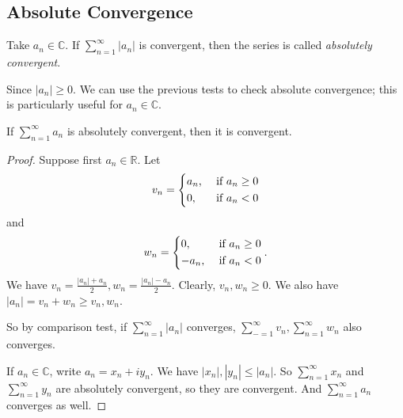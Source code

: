 \subsection{Absolute Convergence}
\begin{definition}
    Take \(a_n \in \mathbb{C}\). If \(\sum\limits_{n=1}^{\infty} \left\vert a_n \right\vert \) is convergent, then the series is called \textit{absolutely convergent}.
\end{definition}
\begin{note}
    Since \(\left\vert a_n \right\vert \geq 0\). We can use the previous tests to check absolute convergence; this is particularly useful for \(a_n \in \mathbb{C}\).
\end{note}
\begin{theorem}
    \label{absiscon}
    If \(\sum\limits_{n=1}^{\infty} a_n\) is absolutely convergent, then it is convergent.
\end{theorem}
\begin{proof}
    Suppose first \(a_n \in \mathbb{R}\). Let
    \[
        v_n = \begin{dcases}
            a_n, &\text{ if } a_n \geq 0\\
            0, &\text{ if }a_n < 0 \\
        \end{dcases}
    \]
    and
    \[
        w_n = \begin{dcases}
            0, &\text{ if } a_n \geq 0\\
            -a_n, &\text{ if }a_n < 0 \\
        \end{dcases}.
    \]
    We have \(v_n = \frac{\left\vert a_n \right\vert +a_n}{2}, w_n = \frac{\left\vert a_n \right\vert -a_n}{2}\). Clearly, \(v_n, w_n \geq 0\). We also have \(\left\vert a_n \right\vert = v_n + w_n \geq v_n, w_n\).

    So by comparison test, if \(\sum\limits_{n=1}^{\infty} \left\vert a_n \right\vert \) converges, \(\sum\limits_{-=1}^{\infty} v_n, \sum\limits_{n=1}^{\infty} w_n\) also converges.

    If \(a_n \in \mathbb{C}\), write \(a_n = x_n + iy_n\). We have \(\left\vert x_n \right\vert, \left\vert y_n \right\vert \leq \left\vert a_n \right\vert \). So \(\sum\limits_{n=1}^{\infty} x_n\) and \(\sum\limits_{n=1}^{\infty} y_n\) are absolutely convergent, so they are convergent. And \(\sum\limits_{n=1}^{\infty} a_n\) converges as well.
\end{proof}
